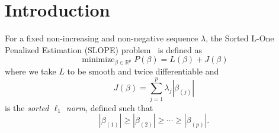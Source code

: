 \section{Introduction}\label{sec:introduction}

For a fixed non-increasing and non-negative sequence \(\lambda\), the
Sorted L-One Penalized Estimation (SLOPE) problem~\cite{bogdan2013,bogdan2015}
is defined as
\begin{equation}
  \label{eq:slope-problem}
  \operatorname{minimize}_{\beta \in \mathbb{R}^p}
  P(\beta) = L(\beta) + J(\beta)
\end{equation}
where we take \(L\) to be smooth and twice differentiable and
\begin{equation}
  \label{eq:sortedl-l1-norm}
  J(\beta) = \sum_{j=1}^p \lambda_j|\beta_{(j)}|
\end{equation}
is the \emph{sorted \(\ell_1\) norm}, defined such that
\[
  |\beta_{(1)}| \geq |\beta_{(2)}| \geq \cdots \geq |\beta_{(p)}|.
\]
